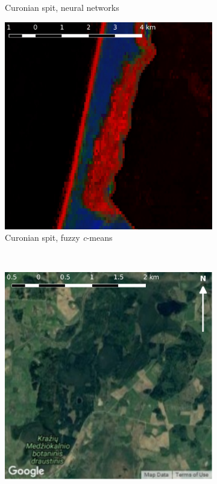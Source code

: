 \documentclass[a4paper,12pt]{scrbook}
\begin{document}
\begin{figure}
\begin{subfigure}[t]{.23\textwidth}
    \caption{Curonian spit, neural networks}
  \end{subfigure} \hfill
  \begin{subfigure}[t]{.23\textwidth}
    \includegraphics[width=\textwidth]{thesis-figures/figures-qgis/kursiunerija-cm}
    \caption{Curonian spit, fuzzy \textit{c}-means}
    \label{subfig-kursiunerija-cm}
  \end{subfigure} \
  \begin{subfigure}[t]{.23\textwidth}
    \includegraphics[width=\textwidth]{thesis-figures/figures-qgis/medziokalnis-google}

\end{subfigure}
\end{figure}
\end{document}
